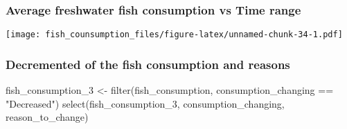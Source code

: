 \documentclass[
]{article}
\newenvironment{Shaded}{\begin{snugshade}}{\end{snugshade}}
\newcommand{\AttributeTok}[1]{\textcolor[rgb]{0.77,0.63,0.00}{#1}}
\newcommand{\FunctionTok}[1]{\textcolor[rgb]{0.00,0.00,0.00}{#1}}
\newcommand{\NormalTok}[1]{#1}
\newcommand{\OtherTok}[1]{\textcolor[rgb]{0.56,0.35,0.01}{#1}}
\newcommand{\SpecialCharTok}[1]{\textcolor[rgb]{0.00,0.00,0.00}{#1}}
\newcommand{\StringTok}[1]{\textcolor[rgb]{0.31,0.60,0.02}{#1}}
\begin{document}
\hypertarget{average-freshwater-fish-consumption-vs-time-range}{%
\subsubsection{Average freshwater fish consumption vs Time
range}\label{average-freshwater-fish-consumption-vs-time-range}}

\begin{Shaded}
\end{Shaded}

\texttt{[image: fish\_counsumption\_files/figure-latex/unnamed-chunk-34-1.pdf]}

\hypertarget{decremented-of-the-fish-consumption-and-reasons}{%
\subsubsection{Decremented of the fish consumption and
reasons}\label{decremented-of-the-fish-consumption-and-reasons}}

\begin{Shaded}
\begin{Highlighting}[]
\NormalTok{fish\_consumption\_3 }\OtherTok{\textless{}{-}} \FunctionTok{filter}\NormalTok{(fish\_consumption, consumption\_changing }\SpecialCharTok{==} \StringTok{"Decreased"}\NormalTok{)}
                         \FunctionTok{select}\NormalTok{(fish\_consumption\_3, consumption\_changing, reason\_to\_change)}
\end{Highlighting}
\end{Shaded}
\end{document}
